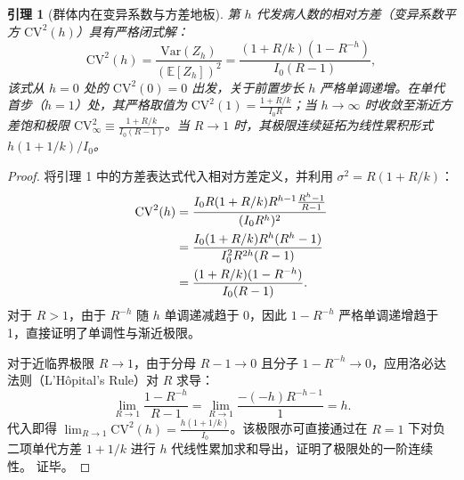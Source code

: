 \documentclass[11pt,a4paper]{article}
\theoremstyle{plain}
\newtheorem{lemma}{引理}
\theoremstyle{definition}
\begin{document}
\begin{lemma}[群体内在变异系数与方差地板]\label{lem:cv_floor}
第 $h$ 代发病人数的相对方差（变异系数平方 $\text{CV}^2(h)$）具有严格闭式解：
\begin{equation}
\text{CV}^2(h) = \frac{\text{Var}(Z_h)}{(\mathbb{E}[Z_h])^2} = \frac{(1 + R/k)(1 - R^{-h})}{I_0(R - 1)},
\label{eq:cv_floor}
\end{equation}
该式从 $h=0$ 处的 $\text{CV}^2(0)=0$ 出发，关于前置步长 $h$ 严格单调递增。在单代首步（$h=1$）处，其严格取值为 $\text{CV}^2(1) = \frac{1+R/k}{I_0 R}$；当 $h \to \infty$ 时收敛至渐近方差饱和极限 $\text{CV}^2_\infty \equiv \frac{1 + R/k}{I_0(R - 1)}$。当 $R \to 1$ 时，其极限连续延拓为线性累积形式 $h(1+1/k)/I_0$。
\end{lemma}

\begin{proof}
将引理 1 中的方差表达式代入相对方差定义，并利用 $\sigma^2 = R(1 + R/k)$：
\begin{align}
\text{CV}^2(h) &= \frac{I_0 R(1 + R/k) R^{h-1} \frac{R^h - 1}{R - 1}}{(I_0 R^h)^2} \notag \\
&= \frac{I_0 (1 + R/k) R^h (R^h - 1)}{I_0^2 R^{2h} (R - 1)} \notag \\
&= \frac{(1 + R/k)(1 - R^{-h})}{I_0(R - 1)}.
\end{align}
对于 $R > 1$，由于 $R^{-h}$ 随 $h$ 单调递减趋于 0，因此 $1 - R^{-h}$ 严格单调递增趋于 1，直接证明了单调性与渐近极限。

对于近临界极限 $R \to 1$，由于分母 $R - 1 \to 0$ 且分子 $1 - R^{-h} \to 0$，应用洛必达法则（L'H\^opital's Rule）对 $R$ 求导：
\begin{equation}
\lim_{R \to 1} \frac{1 - R^{-h}}{R - 1} = \lim_{R \to 1} \frac{-(-h) R^{-h-1}}{1} = h.
\end{equation}
代入即得 $\lim_{R \to 1} \text{CV}^2(h) = \frac{h(1 + 1/k)}{I_0}$。该极限亦可直接通过在 $R=1$ 下对负二项单代方差 $1+1/k$ 进行 $h$ 代线性累加求和导出，证明了极限处的一阶连续性。
证毕。
\end{proof}
\end{document}
